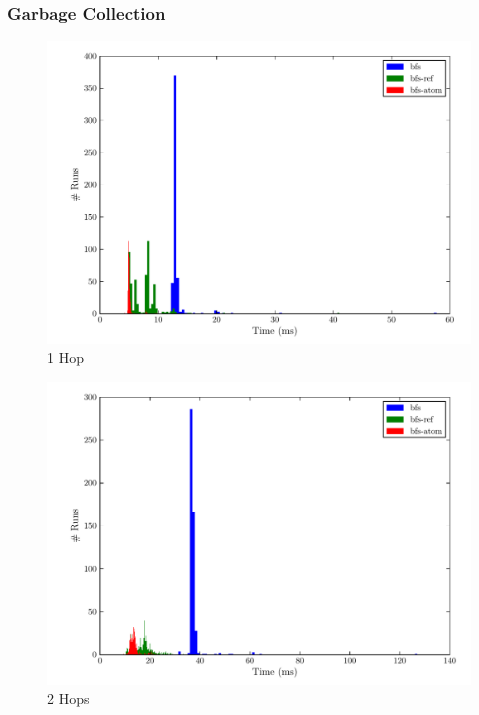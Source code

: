 \documentclass[12pt,letterpaper,oneside]{report}
\theoremstyle{definition}
\begin{document}
			\subsubsection{Garbage Collection}
				
		
		\begin{figure}[!ht]
			\centering
			\includegraphics[scale=0.85]{1_hops}
			\caption{1 Hop}
			\label{fig:perf-1-hop}
		\end{figure}
		
		\begin{figure}[!ht]
			\centering
			\includegraphics[scale=0.85]{2_hops}
			\caption{2 Hops}
			\label{fig:perf-2-hops}
		\end{figure}
		
\end{document}
